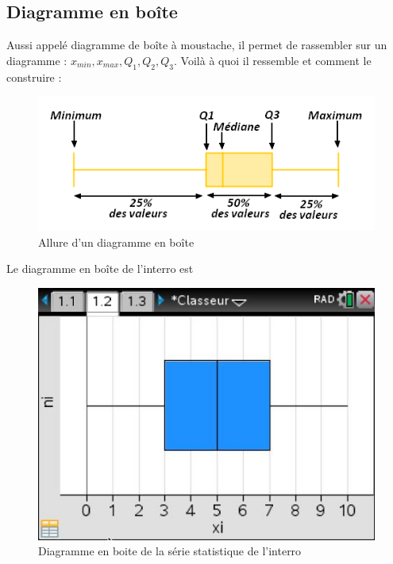 \subsection{Diagramme en boîte}
Aussi appelé diagramme de boîte à moustache, il permet de rassembler sur un diagramme : $x_{min}, x_{max}, Q_1, Q_2, Q_3$. Voilà à quoi il ressemble et comment le construire : 
\begin{figure}[H]
\centering
\includegraphics{images/moustache.png}
\caption{Allure d'un diagramme en boîte}
\end{figure}
\newline

\begin{exemple}
Le diagramme en boîte de l'interro est 
\begin{figure}[H]
\centering
\includegraphics[scale=0.5]{images/moustache_notes.jpg}
\caption{Diagramme en boite de la série statistique de l'interro}
\end{figure}
\end{exemple}
